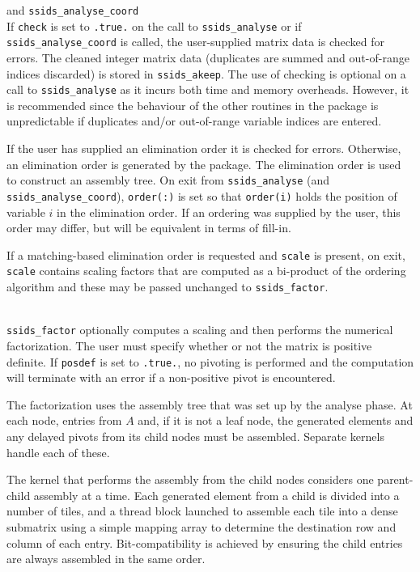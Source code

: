 \documentclass{spral}
\begin{document}
\vspace{0.2in}
 and {\tt ssids\_analyse\_coord} \\
If {\tt check} is set to {\tt .true.} on the call to {\tt ssids\_analyse}
or if {\tt ssids\_analyse\_coord} is called, 
the user-supplied matrix data is checked for errors. The cleaned integer matrix data
(duplicates are summed and out-of-range indices discarded) is stored in
{\tt ssids\_akeep}.
The use of checking is optional on a call to {\tt ssids\_analyse} as it
incurs both time and memory overheads. However, it is recommended
since the behaviour of the other routines in the package
is unpredictable if duplicates and/or out-of-range variable indices are entered.

If the user has supplied an elimination order it is checked for errors. Otherwise,
an elimination order is generated by the package. 
The elimination order is used to construct an assembly tree.
On exit from {\tt ssids\_analyse} (and {\tt ssids\_analyse\_coord}), 
{\tt order(:)} is set so that {\tt order(i)} holds the position
of variable $i$ in the elimination order. If an ordering was supplied by the user, this
order may differ, but will be equivalent in terms of fill-in.

If a matching-based elimination order is requested and {\tt scale} is present, on exit,
{\tt scale} contains scaling factors that are computed as a bi-product of
the ordering algorithm and these may be passed unchanged to {\tt ssids\_factor}.

\vspace{0.2in}
\\
{\tt ssids\_factor} optionally computes a scaling and then performs the numerical factorization.
 The user must specify whether or not the matrix is
positive definite. If {\tt posdef} is set to {\tt .true.}, no pivoting
is performed and the computation will terminate with an error if a
non-positive pivot is encountered.

The factorization uses the assembly tree that was set up by the analyse phase.
At each  node,  entries from $A$ and, if it is not a leaf node,
the generated elements and any delayed pivots from its child nodes
must be assembled. Separate kernels handle each of these.


The kernel that performs the assembly from the child nodes considers one parent-child
assembly at a time. Each  generated element from a child is divided into a number of
tiles, and a thread block launched to assemble each tile into a 
dense submatrix using a simple
mapping array to determine the destination row and column of each entry.
Bit-compatibility is achieved by ensuring the child entries are
always assembled in the same order. 
\end{document}

